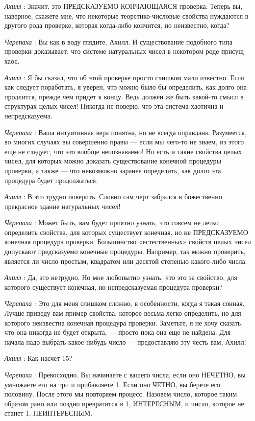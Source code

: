 \documentclass[../main.tex]{subfiles}
\begin{document}
\begin{dialogue}
\emph{Ахилл} : Значит, это ПРЕДСКАЗУЕМО КОНЧАЮЩАЯСЯ проверка. Теперь вы, наверное, скажете мне, что некоторые теоретико-числовые свойства нуждаются в другого рода проверке, которая когда-либо кончится, но неизвестно, когда?

\emph{Черепаха} : Вы как в воду глядите, Ахилл. И существование подобного типа проверки доказывает, что системе натуральных чисел в некотором роде присущ хаос.

\emph{Ахилл} : Я бы сказал, что об этой проверке просто слишком мало известно. Если как следует поработать, я уверен, что можно было бы определить, как долго она продлится, прежде чем придет к концу. Ведь должен же быть какой-то смысл в структурах целых чисел! Никогда не поверю, что эта система хаотична и непредсказуема.

\emph{Черепаха} : Ваша интуитивная вера понятна, но не всегда оправдана. Разумеется, во многих случаях вы совершенно правы --- если мы чего-то не знаем, из этого еще не следует, что это вообще непознаваемо! Но есть и такие свойства целых чисел, для которых можно доказать существование конечной процедуры проверки, а также --- что невозможно заранее определить, как долго эта процедура будет продолжаться.

\emph{Ахилл} : В это трудно поверить. Словно сам черт забрался в божественно прекрасное здание натуральных чисел!

\emph{Черепаха} : Может быть, вам будет приятно узнать, что совсем не легко определить свойства, для которых существует конечная, но не ПРЕДСКАЗУЕМО конечная процедура проверки. Большинство «естественных» свойств целых чисел допускают предсказуемо конечные процедуры. Например, так можно проверить, является ли число простым, квадратом или десятой степенью какого-либо числа.

\emph{Ахилл} : Да, это нетрудно. Но мне любопытно узнать, что это за свойство, для которого существует конечная, но непредсказуемая процедура проверки?

\emph{Черепаха} : Это для меня слишком сложно, в особенности, когда я такая сонная. Лучше приведу вам пример свойства, которое весьма легко определить, но для которого неизвестна конечная процедура проверки. Заметьте, я не хочу сказать, что она никогда не будет открыта, --- просто пока она еще не найдена. Для начала надо выбрать какое-нибудь число --- предоставляю эту честь вам, Ахилл!

\emph{Ахилл} : Как насчет 15?

\emph{Черепаха} : Превосходно. Вы начинаете с вашего числа; если оно НЕЧЕТНО, вы умножаете его на три и прибавляете 1. Если оно ЧЕТНО, вы берете его половину. После этого мы повторяем процесс. Назовем число, которое таким образом рано или поздно превратится в 1, ИНТЕРЕСНЫМ, и число, которое не станет 1, НЕИНТЕРЕСНЫМ.


\end{dialogue}
\end{document}
